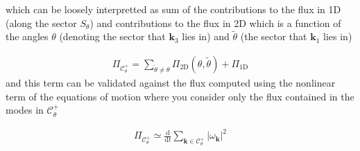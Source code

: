 \documentclass[9pt]{article}
\newcommand{\der}[2]{\frac{\mathrm{d}#1}{\mathrm{d}#2}}          	 %
\newcommand{\bfk}{\mathbf{k}}								%
\newcommand{\bfkn}[1]{\mathbf{k}_{#1}}								%
\begin{document}
which can be loosely interpretted as sum of the contributions to the flux in 1D (along the sector $S_\theta$) and contributions to the flux in 2D which is a function of the angles $\theta$ (denoting the sector that $\bfkn{3}$ lies in) and $\tilde{\theta}$ (the sector that $\bfkn{1}$ lies in)
	
\begin{align}
	\Pi_{\mathcal{C}_{\theta}^{+}} = \sum_{\tilde{\theta} \neq \theta} \Pi_{\text{2D}}(\theta, \tilde{\theta}) + \Pi_{\text{1D}}
\end{align}
and this term can be validated against the flux computed using the nonlinear term of the equations of motion where you consider only the flux contained in the modes in $\mathcal{C}_{\theta}^{+}$

\begin{align}
	\Pi_{\mathcal{C}_{\theta}^{+}} \simeq \der{}{t} \sum_{\bfk \in \mathcal{C}_{\theta}^{+}} |\omega_{\bfk}|^2
\end{align}
\end{document}
